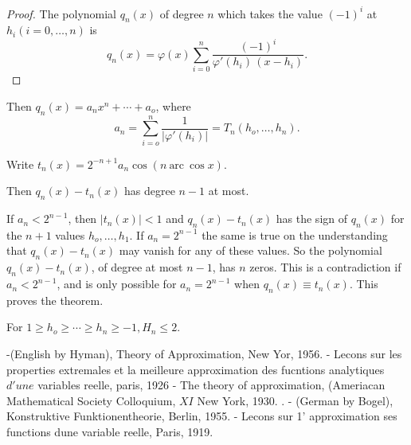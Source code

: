 \begin{proof}
  The polynomial $q_n(x)$ of degree $n$ which takes the value $(-1)^i$
  at $h_i(i=0, \ldots , n)$ is  
  $$
  q_n(x) = \varphi (x) \sum_{i=0}^n
  \frac{(-1)^i}{\varphi'(h_i)\,(x-h_i)}.  
  $$
\end{proof}

Then $q_n(x) =a_n x^n + \cdots + a_o$, where 
$$
a_n = \sum_{i=o}^n \frac{1}{| \varphi' (h_i) |} = T_n (h_o, \ldots, 
h_n). 
$$

Write $t_n(x)= 2^{-n+1}a_n \cos (n ~\text{arc}~ \cos x)$. 

Then $q_n(x) - t_n (x)$ has degree $n-1$ at most.

If $a_n < 2^{n-1}$, then $|t_n (x)| < 1$ and $q_n(x) - t_n(x)$ has the
sign of $q_n(x)$ for the $n+1$ values $h_o,  \ldots ,  h_1$. If $a_n=
2^{n-1}$ the same is true on the understanding that $q_n (x)- t_n(x)$
may vanish for any of these values. So the polynomial $q_n (x)-
t_n(x)$, of degree at most $n-1$, has $n$ zeros. This is a
contradiction if $a_n < 2^{n-1}$, and is only possible for  $a_n =
2^{n-1}$  when $q_n(x) \equiv t_n (x)$. This proves the theorem. 

\begin{coro*}
  For  $1 \ge h_o  \ge \cdots  \ge h_n \ge  -1, H_n \le 2 $.
\end{coro*}

\begin{thebibliography}{99}
-\pageoriginale (English by Hyman), Theory of
  Approximation, New Yor, 1956. 
- Lecons sur les properties extremales et
  la meilleure approximation des fucntions analytiques $d'une$
  variables reelle, paris, 1926 
- The theory of approximation, (Ameriacan
  Mathematical Society Colloquium, $XI$ New York, 1930. 
. - (German by Bogel), Konstruktive
  Funktionentheorie, Berlin, 1955. 
- Lecons sur 1' approximation
  ses functions dune variable reelle, Paris, 1919. 
\end{thebibliography}

